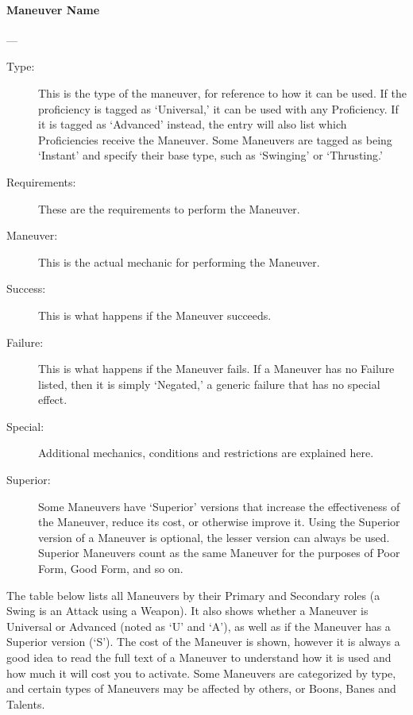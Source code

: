 \documentclass[oneside,11pt,english]{book}
\begin{document}
\paragraph{\large Maneuver Name}---
		\vspace{-10pt}\begin{description}
		\item [Type:] This is the type of the maneuver, for reference to how it can be used. If the proficiency is tagged as ‘Universal,’ it can be used with any Proficiency. If it is tagged as ‘Advanced’ instead, the entry will also list which Proficiencies receive the Maneuver. Some Maneuvers are tagged as being ‘Instant’ and specify their base type, such as ‘Swinging’ or ‘Thrusting.’
		\item [Requirements:] These are the requirements to perform the Maneuver.
		\item [Maneuver:] This is the actual mechanic for performing the Maneuver.
		\item [Success:] This is what happens if the Maneuver succeeds.
		\item [Failure:] This is what happens if the Maneuver fails. If a Maneuver has no Failure listed, then it is simply ‘Negated,’ a generic failure that has no special effect.
		\item [Special:] Additional mechanics, conditions and restrictions are explained here.
		\item [Superior:] Some Maneuvers have ‘Superior’ versions that increase the effectiveness of the Maneuver, reduce its cost, or otherwise improve it. Using the Superior version of a Maneuver is optional, the lesser version can always be used. Superior Maneuvers count as the same Maneuver for the purposes of Poor Form, Good Form, and so on.
\end{description}
The table below lists all Maneuvers by their Primary and Secondary roles (a Swing is an Attack using a 
Weapon). It also shows whether a Maneuver is Universal or Advanced (noted as ‘U’ and ‘A’), as well as 
if the Maneuver has a Superior version (‘S’). The cost of the Maneuver is shown, however it is always a 
good idea to read the full text of a Maneuver to understand how it is used and how much it will cost you 
to activate. Some Maneuvers are categorized by type, and certain types of Maneuvers may be affected by 
others, or Boons, Banes and Talents.
\end{document}
